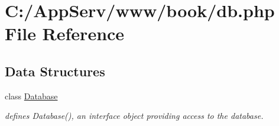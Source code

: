 \hypertarget{db_8php}{
\section{C:/AppServ/www/book/db.php File Reference}
\label{db_8php}
}
\subsection*{Data Structures}
\begin{DoxyCompactItemize}
\item 
class \hyperlink{class_database}{Database}
\begin{DoxyCompactList}\small\item\em defines Database(), an interface object providing access to the database. \item\end{DoxyCompactList}\end{DoxyCompactItemize}

